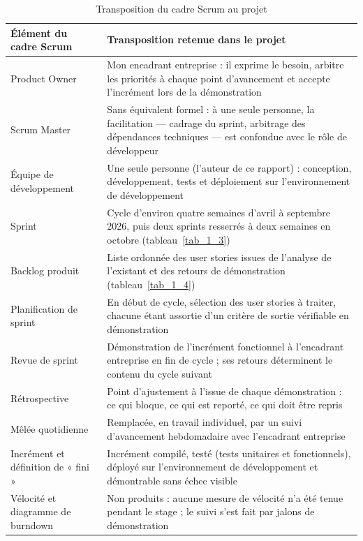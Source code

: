 \setcounter{table}{0}
\begin{table}[!ht]
\centering
\caption{Transposition du cadre Scrum au projet}
\label{tab_1_1}
\renewcommand{\arraystretch}{1.25}\footnotesize
\setlength{\tabcolsep}{4pt}%
\begin{tabular}{|P{0.235\textwidth}|P{0.695\textwidth}|}
\hline
\textbf{Élément du cadre Scrum} & \textbf{Transposition retenue dans le projet} \\
\hline
Product Owner & Mon encadrant entreprise : il exprime le besoin, arbitre les priorités à chaque point d’avancement et accepte l’incrément lors de la démonstration \\
\hline
Scrum Master & Sans équivalent formel : à une seule personne, la facilitation — cadrage du sprint, arbitrage des dépendances techniques — est confondue avec le rôle de développeur \\
\hline
Équipe de développement & Une seule personne (l’auteur de ce rapport) : conception, développement, tests et déploiement sur l’environnement de développement \\
\hline
Sprint & Cycle d’environ quatre semaines d’avril à septembre 2026, puis deux sprints resserrés à deux semaines en octobre (tableau~\ref{tab_1_3}) \\
\hline
Backlog produit & Liste ordonnée des user stories issues de l’analyse de l’existant et des retours de démonstration (tableau~\ref{tab_1_4}) \\
\hline
Planification de sprint & En début de cycle, sélection des user stories à traiter, chacune étant assortie d’un critère de sortie vérifiable en démonstration \\
\hline
Revue de sprint & Démonstration de l’incrément fonctionnel à l’encadrant entreprise en fin de cycle ; ses retours déterminent le contenu du cycle suivant \\
\hline
Rétrospective & Point d’ajustement à l’issue de chaque démonstration : ce qui bloque, ce qui est reporté, ce qui doit être repris \\
\hline
Mêlée quotidienne & Remplacée, en travail individuel, par un suivi d’avancement hebdomadaire avec l’encadrant entreprise \\
\hline
Incrément et définition de « fini » & Incrément compilé, testé (tests unitaires et fonctionnels), déployé sur l’environnement de développement et démontrable sans échec visible \\
\hline
Vélocité et diagramme de burndown & Non produits : aucune mesure de vélocité n’a été tenue pendant le stage ; le suivi s’est fait par jalons de démonstration \\
\hline
\end{tabular}
\end{table}
